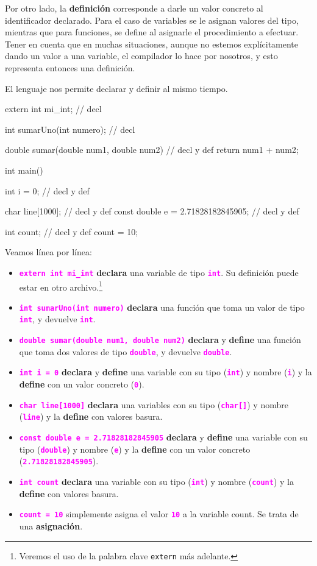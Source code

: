 \documentclass[]{scrartcl}
\newcommand{\hl}[1]{\textcolor{magenta}{\textbf{\texttt{#1}}}}
\begin{document}
Por otro lado, la \textbf{definición} corresponde a darle un valor concreto al identificador declarado. Para el caso de variables se le asignan valores del tipo, mientras que para funciones, se define al asignarle el procedimiento a efectuar. Tener en cuenta que en muchas situaciones, aunque no estemos explícitamente dando un valor a una variable, el compilador lo hace por nosotros, y esto representa entonces una definición. 

El lenguaje nos permite declarar y definir al mismo tiempo.

\begin{cbox}[]{}

  extern int mi_int;                   // decl

  int sumarUno(int numero);            // decl

  double sumar(double num1, double num2){ // decl y def
    return num1 + num2;
  }

  int main(){
    int i = 0;                         // decl y def
    
    char line[1000];                   // decl y def
    const double e = 2.71828182845905; // decl y def

    int count;                         // decl y def
    count = 10;                        
  }
\end{cbox}

Veamos línea por línea:
\begin{itemize}
  \item \hl{extern int mi\_int} \textbf{declara} una variable de tipo \hl{int}. Su definición puede estar en otro archivo.\footnote{Veremos el uso de la palabra clave \texttt{extern} más adelante.}
  \item \hl{int sumarUno(int numero)} \textbf{declara} una función que toma un valor de tipo \hl{int}, y devuelve \hl{int}.
  \item \hl{double sumar(double num1, double num2)} \textbf{declara} y \textbf{define} una función que toma dos valores de tipo \hl{double}, y devuelve \hl{double}.
  \item \hl{int i = 0} \textbf{declara} y \textbf{define} una variable con su tipo (\hl{int}) y nombre (\hl{i}) y la \textbf{define} con un valor concreto (\hl{0}). 
  \item \hl{char line[1000]} \textbf{declara} una variables con su tipo (\hl{char[]}) y nombre (\hl{line}) y la \textbf{define} con valores basura. 
  \item \hl{const double e = 2.71828182845905} \textbf{declara} y \textbf{define} una variable con su tipo (\hl{double}) y nombre (\hl{e}) y la \textbf{define} con un valor concreto (\hl{2.71828182845905}).
  \item \hl{int count} \textbf{declara} una variable con su tipo (\hl{int}) y nombre (\hl{count}) y la \textbf{define} con valores basura.
  \item \hl{count = 10} simplemente asigna el valor \hl{10} a la variable count. Se trata de una \textbf{asignación}. 
\end{itemize}
\end{document}
